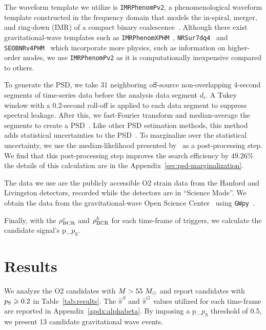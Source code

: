\documentclass[useAMS,fleqn, usenatbib, final]{mnras}
\newcommand{\code}[1]{{\texttt{#1}}\xspace}
\newcommand{\gwpy}{\code{GWpy}}
\newcommand{\imrphenomp}{{\sc \texttt{IMRPhenomPv2}}\xspace}
\newcommand{\seob}{{\sc \texttt{SEOBNRv4PHM}}\xspace}
\newcommand{\nrsur}{{\sc \texttt{NRSur7dq4}}\xspace}
\newcommand{\imrxhm}{{\sc \texttt{IMRPhenomXPHM}}\xspace}
\newcommand{\fancytext}[1]{{\relax\ifmmode#1\else $#1$\fi}\xspace}
\newcommand{\mathcmd}[1]{{\sc \relax\ifmmode#1\else $#1$\fi}\xspace}
\newcommand{\bgrdbcr}{\mathcmd{\rho_\text{BCR}^\textit{b}}}
\newcommand{\candbcr}{\mathcmd{\rho_\text{BCR}^\textit{c}}}
\newcommand{\msun}{\mathcmd{M_\odot}}
\newcommand{\totMlab}{\mathcmd{M}}
\newcommand{\pastrobcr}{\fancytext{p_\text{S}}}
\begin{document}
The waveform template we utilize is \imrphenomp, a phenomenological waveform template constructed in the frequency domain that models the in-spiral, merger, and ring-down (IMR) of a compact binary coalescence~\citep{khan2016frequency}. Although there exist gravitational-wave templates such as \imrxhm~\citep{imrphenompxhm}, \nrsur~\citep{nrsur7dq4} and \seob~\citep{seobnrv4phm} which incorporate more physics, such as information on higher-order modes, we use \imrphenomp as it is computationally inexpensive compared to others. 



To generate the PSD, we take 31 neighboring off-source non-overlapping  4-second  segments of time-series data before the analysis data segment $d_i$. A Tukey window with a 0.2-second roll-off is applied to each data segment to suppress spectral leakage. After this, we fast-Fourier transform and median-average the segments to create a PSD~\citep{ligo_psd}. Like other PSD estimation methods, this method adds statistical uncertainties to the PSD~\citep{psd_student_t, chatziioannou2019noise, Biscoveanu:2020:PhRvD}. To marginalize over the statistical uncertainty, we use the median-likelihood presented by~\citet{psd_student_t} as a post-processing step. We find that this post-processing step improves the search efficiency by $49.26\%$ the details of this calculation are in the Appendix~\ref{sec:psd-marginalization}.

The data we use are the publicly accessible O2 strain data from the Hanford and Livingston detectors, recorded while the detectors are in ``Science Mode''. We obtain the data from the gravitational-wave Open Science Center~\citep{GWOSC} using \gwpy~\citep{gwpy}. 

Finally, with the $\candbcr$ and $\bgrdbcr$ for each time-frame of triggers, we calculate the candidate signal's \pastrobcr. 

\section{Results}
\label{sec:Results}

We analyze the O2 candidates with ${\totMlab > 55~\msun}$ and report candidates with ${\pastrobcr\geq0.2}$ in Table~\ref{tab:results}. The $\hat{\pi}^S$ and $\hat{\pi}^G$ values utilized for each time-frame are reported in Appendix~\ref{apdx:alphabeta}. By imposing a \pastrobcr threshold of 0.5, we present 13 candidate gravitational wave events. 


\end{document}
